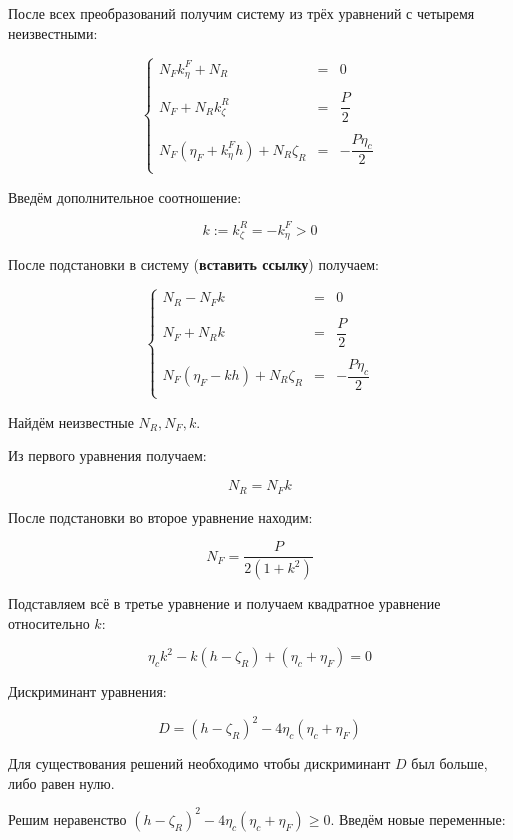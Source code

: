 После всех преобразований получим систему из трёх уравнений с четыремя неизвестными:

\begin{equation}
\left\{
\begin{array}{rcl}
N_Fk_\eta^F+N_R & = & 0\\
\\
N_F+N_Rk_\zeta^R & = & \dfrac{P}{2}\\
\\
N_F(\eta_F+k_\eta^Fh)+N_R\zeta_R & = & -\dfrac{P\eta_c}{2}\\
\end{array}
\right.
\end{equation}

Введём дополнительное соотношение:

$$
k:=k_\zeta^R = -k_\eta^F>0
$$

После подстановки в систему (\textbf{вставить ссылку}) получаем:

\begin{equation}
\left\{
\begin{array}{rcl}
N_R-N_Fk & = & 0\\
\\
N_F+N_Rk & = & \dfrac{P}{2}\\
\\
N_F(\eta_F-kh)+N_R\zeta_R & = & -\dfrac{P\eta_c}{2}\\
\end{array}
\right.
\end{equation}

Найдём неизвестные $N_R,N_F,k$.

Из первого уравнения получаем:

$$
N_R = N_Fk
$$

После подстановки во второе уравнение находим:

$$
N_F = \dfrac{P}{2(1+k^2)}
$$

Подставляем всё в третье уравнение и получаем квадратное уравнение относительно $k$:

\begin{equation}
\eta_ck^2-k(h-\zeta_R)+(\eta_c+\eta_F) = 0
\end{equation}

Дискриминант уравнения:

$$
D = (h-\zeta_R)^2-4\eta_c(\eta_c+\eta_F)
$$

Для существования решений необходимо чтобы дискриминант $D$ был больше, либо равен нулю.

Решим неравенство $(h-\zeta_R)^2-4\eta_c(\eta_c+\eta_F) \geq 0$. Введём новые переменные:

